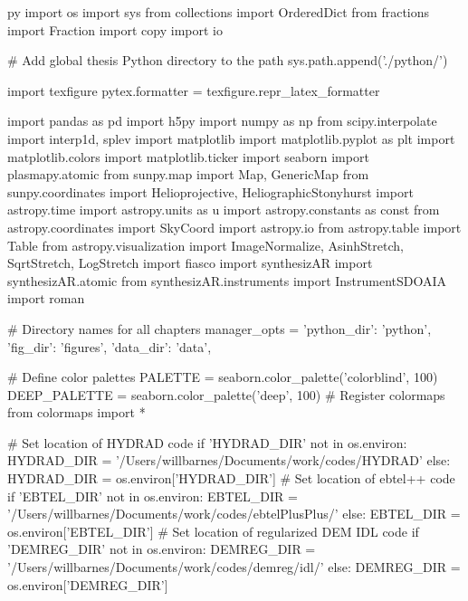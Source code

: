 \begin{pythontexcustomcode}{py}
import os
import sys
from collections import OrderedDict
from fractions import Fraction
import copy
import io

# Add global thesis Python directory to the path
sys.path.append('./python/')

import texfigure
pytex.formatter = texfigure.repr_latex_formatter

import pandas as pd
import h5py
import numpy as np
from scipy.interpolate import interp1d, splev
import matplotlib
import matplotlib.pyplot as plt
import matplotlib.colors
import matplotlib.ticker
import seaborn
import plasmapy.atomic
from sunpy.map import Map, GenericMap
from sunpy.coordinates import Helioprojective, HeliographicStonyhurst
import astropy.time
import astropy.units as u
import astropy.constants as const
from astropy.coordinates import SkyCoord
import astropy.io
from astropy.table import Table
from astropy.visualization import ImageNormalize, AsinhStretch, SqrtStretch, LogStretch
import fiasco
import synthesizAR
import synthesizAR.atomic
from synthesizAR.instruments import InstrumentSDOAIA
import roman

# Directory names for all chapters
manager_opts = {'python_dir': 'python', 'fig_dir': 'figures', 'data_dir': 'data',}

# Define color palettes
PALETTE = seaborn.color_palette('colorblind', 100)
DEEP_PALETTE = seaborn.color_palette('deep', 100)
# Register colormaps
from colormaps import *

# Set location of HYDRAD code
if 'HYDRAD_DIR' not in os.environ:
	HYDRAD_DIR = '/Users/willbarnes/Documents/work/codes/HYDRAD'
else:
	HYDRAD_DIR = os.environ['HYDRAD_DIR']
# Set location of ebtel++ code
if 'EBTEL_DIR' not in os.environ:
	EBTEL_DIR = '/Users/willbarnes/Documents/work/codes/ebtelPlusPlus/'
else:
	EBTEL_DIR = os.environ['EBTEL_DIR']
# Set location of regularized DEM IDL code
if 'DEMREG_DIR' not in os.environ:
	DEMREG_DIR = '/Users/willbarnes/Documents/work/codes/demreg/idl/'
else:
	DEMREG_DIR = os.environ['DEMREG_DIR']


\end{pythontexcustomcode}
